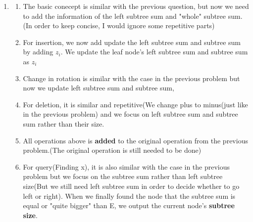 \documentclass{article}
\begin{document}
\begin{CJK*}{UTF8}{bsmi}
\begin{enumerate}
    
    \item \begin{enumerate}
        \item The basic conecept is similar with the previous question, but now we need to add the information of the left subtree sum and "whole" subtree sum. (In order to keep concise, I would ignore some repetitive parts)
        \item For insertion, we now add update the left subtree sum and subtree sum by adding $z_i$. We update the leaf node's left subtree sum and subtree sum as $z_i$
        \item Change in rotation is similar with the case in the previous problem but now we update left subtree sum and subtree sum,
        \item For deletion, it is similar and repetitive(We change plus to minus(just like in the previous problem) and we focus on left subtree sum and subtree sum rather than their size.
        \item All operations above is \textbf{added} to the original operation from the previous problem.(The original operation is still needed to be done)
        \item For query(Finding x), it is also similar with the case in the previous problem but we focus on the subtree sum rather than left subtree size(But we still need left subtree sum in order to decide whether to go left or right). When we finally found the node that the subtree sum is equal or "quite bigger" than E, we output the current node's \textbf{subtree size}. 
    \end{enumerate} 
     
    
\end{enumerate}



\end{CJK*}
\end{document}
